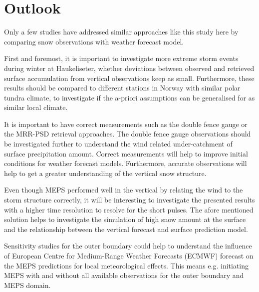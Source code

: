 \section{Outlook}
Only a few studies have addressed similar approaches like this study here by comparing snow observations with weather forecast model. %
\par\medskip
\noindent
First and foremost, it is important to investigate more extreme storm events during winter at Haukeliseter, whether deviations between observed and retrieved surface accumulation from vertical observations keep as small. Furthermore, these results should be compared to different stations in Norway with similar polar tundra climate, to investigate if the a-priori assumptions can be generalised for as similar local climate. 
\par\medskip
\noindent
It is important to have correct measurements such as the double fence gauge or the MRR-PSD retrieval approaches. The double fence gauge observations should be investigated further to understand the wind related under-catchment of surface precipitation amount. Correct measurements will help to improve initial conditions for weather forecast models. %
Furthermore, accurate observations will help to get a greater understanding of the vertical snow structure.
\par\medskip
\noindent
Even though MEPS performed well in the vertical by relating the wind to the storm structure correctly, it will be interesting to investigate the presented results with a higher time resolution to resolve for the short pulses. %
The afore mentioned solution helps to investigate the simulation of high snow amount at the surface and the relationship between the vertical forecast and surface prediction model.
\par\medskip
\noindent
Sensitivity studies for the outer boundary could help to understand the influence of European Centre for Medium-Range Weather Forecasts (ECMWF) forecast on the MEPS predictions for local meteorological effects. This means e.g. initiating MEPS with and without all available observations for the outer boundary and MEPS domain. %
